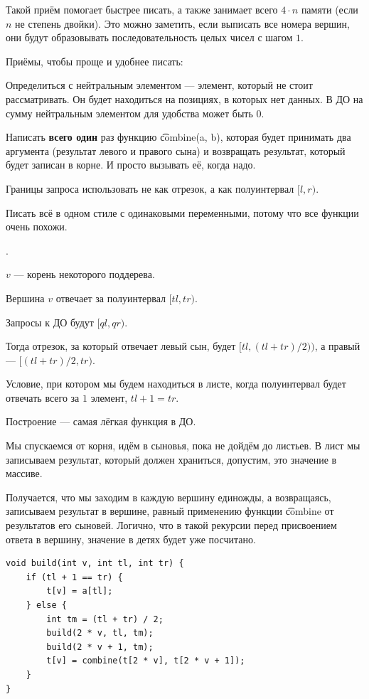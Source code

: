 Такой приём помогает быстрее писать, а также занимает всего $4 \cdot n$ памяти (если $n$ не степень двойки). Это можно заметить, если выписать все номера вершин, они будут образовывать последовательность целых чисел с шагом $1$.

Приёмы, чтобы проще и удобнее писать:

\up \up
\begin{MyList}[0pt]
	\item Определиться с нейтральным элементом --- элемент, который не стоит рассматривать. Он будет находиться на позициях, в которых нет данных. В ДО на сумму нейтральным элементом для удобства может быть $0$.
	\item Написать {\bf всего один} раз функцию \t{combine(a, b)}, которая будет принимать два аргумента (результат левого и правого сына) и возвращать результат, который будет записан в корне. И просто вызывать её, когда надо.
	\item Границы запроса использовать не как отрезок, а как полуинтервал $[l, r)$.
	\item Писать всё в одном стиле с одинаковыми переменными, потому что все функции очень похожи.
\end{MyList} \up \up

.

$v$ --- корень некоторого поддерева.

Вершина $v$ отвечает за полуинтервал $[tl, tr)$.

Запросы к ДО будут $[ql, qr)$.

Тогда отрезок, за который отвечает левый сын, будет $[tl, (tl + tr) / 2))$, а правый --- $[(tl + tr) / 2, tr)$.

Условие, при котором мы будем находиться в листе, когда полуинтервал будет отвечать всего за $1$ элемент, $tl + 1 = tr$.


\pagebreak


Построение --- самая лёгкая функция в ДО. 

Мы спускаемся от корня, идём в сыновья, пока не дойдём до листьев. В лист мы записываем результат, который должен храниться, допустим, это значение в массиве.

Получается, что мы заходим в каждую вершину единожды, а возвращаясь, записываем результат в вершине, равный применению функции \t{combine} от результатов его сыновей. Логично, что в такой рекурсии перед присвоением ответа в вершину, значение в детях будет уже посчитано.
\up \up
\begin{verbatim}
void build(int v, int tl, int tr) {
	if (tl + 1 == tr) {
		t[v] = a[tl];
	} else {
		int tm = (tl + tr) / 2;
		build(2 * v, tl, tm);
		build(2 * v + 1, tm);
		t[v] = combine(t[2 * v], t[2 * v + 1]);
	}
}
\end{verbatim}
\up \up

